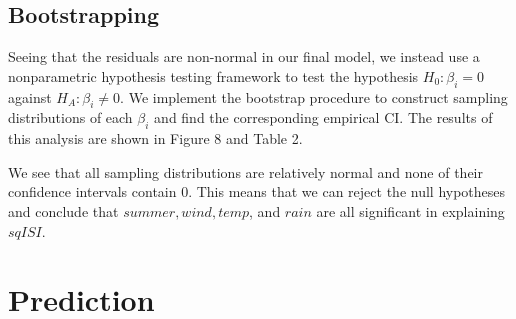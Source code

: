 \documentclass{article}
\begin{document}
\subsection{Bootstrapping}
Seeing that the residuals are non-normal in our final model, we instead use a nonparametric hypothesis testing framework to test the hypothesis $H_0: \beta_i = 0$ against $H_A:\beta_i \neq 0$. We implement the bootstrap procedure to construct sampling distributions of each $\beta_i$ and find the corresponding empirical CI. The results of this analysis are shown in Figure 8 and Table 2.
\begin{figure}[h!]
\begin{floatrow}
\end{floatrow}
\label{boot_res}
\end{figure}
We see that all sampling distributions are relatively normal and none of their confidence intervals contain $0$. This means that we can reject the null hypotheses and conclude that $\textit{summer},\textit{wind}, \textit{temp}$, and $\textit{rain}$ are all significant in explaining $\textit{sqISI}$.

\section{Prediction}\label{Prediction}
\end{document}
